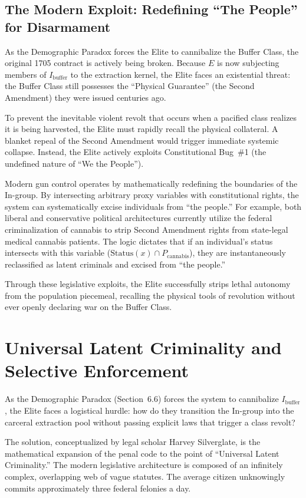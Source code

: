 \subsection{The Modern Exploit: Redefining ``The People'' for Disarmament}

As the Demographic Paradox forces the Elite to cannibalize the Buffer Class, the original 1705 contract is actively being broken. Because $E$ is now subjecting members of $I_{\text{buffer}}$ to the extraction kernel, the Elite faces an existential threat: the Buffer Class still possesses the ``Physical Guarantee'' (the Second Amendment) they were issued centuries ago.

To prevent the inevitable violent revolt that occurs when a pacified class realizes it is being harvested, the Elite must rapidly recall the physical collateral. A blanket repeal of the Second Amendment would trigger immediate systemic collapse. Instead, the Elite actively exploits Constitutional Bug~\#1 (the undefined nature of ``We the People'').

Modern gun control operates by mathematically redefining the boundaries of the In-group. By intersecting arbitrary proxy variables with constitutional rights, the system can systematically excise individuals from ``the people.'' For example, both liberal and conservative political architectures currently utilize the federal criminalization of cannabis to strip Second Amendment rights from state-legal medical cannabis patients. The logic dictates that if an individual's status intersects with this variable ($\text{Status}(x) \cap P_{\text{cannabis}}$), they are instantaneously reclassified as latent criminals and excised from ``the people.''

Through these legislative exploits, the Elite successfully strips lethal autonomy from the population piecemeal, recalling the physical tools of revolution without ever openly declaring war on the Buffer Class.
\section{Universal Latent Criminality and Selective Enforcement}

As the Demographic Paradox (Section~6.6) forces the system to cannibalize $I_{\text{buffer}}$, the Elite faces a logistical hurdle: how do they transition the In-group into the carceral extraction pool without passing explicit laws that trigger a class revolt?

The solution, conceptualized by legal scholar Harvey Silverglate, is the mathematical expansion of the penal code to the point of ``Universal Latent Criminality.'' The modern legislative architecture is composed of an infinitely complex, overlapping web of vague statutes. The average citizen unknowingly commits approximately three federal felonies a day.

